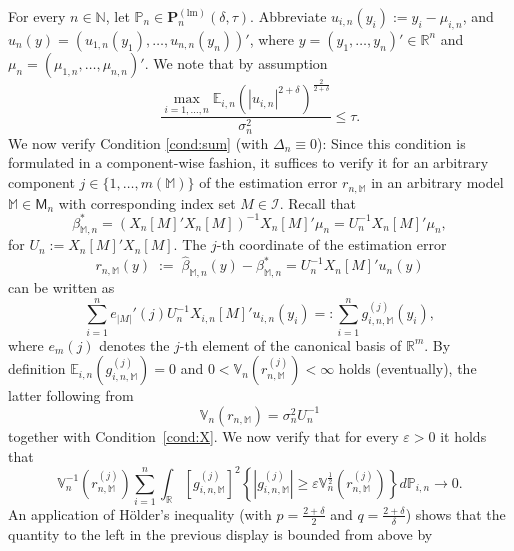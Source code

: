 \documentclass[preprint]{imsart}
\newcommand{\R}{{\mathbb R}}
\newcommand{\N}{{\mathbb N}}
\newcommand{\eps}{\varepsilon}
\newcommand{\M}{\mathbb M}
\numberwithin{equation}{section}
\begin{document}
For every $n \in \N$, let $\mathbb{P}_n \in \mathbf{P}_n^{(\mathrm{lm})}(\delta, \tau)$. Abbreviate $u_{i,n}(y_i) := y_i - \mu_{i,n}$, and $u_n(y) = (u_{1,n}(y_1), \hdots, u_{n,n}(y_n))'$, where $y=(y_1,\dots, y_n)'\in\R^n$ and $\mu_n = (\mu_{1,n},\dots, \mu_{n,n})'$. We note that by assumption
%
\begin{equation}\label{eqn:astau}
\frac{\max_{i = 1, \hdots, n} \mathbb{E}_{i,n} (|u_{i,n}|^{2+\delta})^{\frac{2}{2+\delta}}}{\sigma_n^2} \leq \tau.
\end{equation}
%
We now verify Condition \ref{cond:sum} (with $\Delta_n \equiv  0$): Since this condition is formulated in a component-wise fashion, it suffices to verify it for an arbitrary component $j\in\{1,\dots, m(\M)\}$ of the estimation error $r_{n,\M}$ in an arbitrary model $\M\in\mathsf{M}_n$ with corresponding index set $M\in\mathcal I$. Recall that 
%
\begin{equation}
\beta_{\mathbb{M}, n}^{*} = \left(X_n[M]' X_n[M] \right)^{-1} X_n[M]'\mu_n = U_n^{-1} X_n[M]'\mu_n,
\end{equation}
%
for $U_n := X_n[M]' X_n[M] $. The $j$-th coordinate of the estimation error
%
\begin{equation}
r_{n,\M}(y) \;:=\;  \hat{\beta}_{\M,n}(y) - \beta_{\mathbb{M}, n}^{*}  = U_n^{-1}X_n[M]'u_n(y)
\end{equation}
%
can be written as
%
\begin{equation}
\sum_{i = 1}^n e_{|M|}'(j)U_n^{-1} X_{i,n}[M]' u_{i,n}(y_i) =: \sum_{i=1}^n g^{(j)}_{i,n,\M}(y_i),
\end{equation}
%
where $e_m(j)$ denotes the $j$-th element of the canonical basis of $\R^m$. 
By definition $\mathbb{E}_{i,n} \left( g_{i,n,\M}^{(j)} \right) = 0$  and $0 < \mathbb{V}_{n} \left( r_{n,\M}^{(j)} \right) < \infty$ holds (eventually), the latter following from
%
\begin{equation}\label{eqn:varhomlin}
\mathbb{V}_{n} \left( r_{n,\M} \right) = \sigma_n^2 U_n^{-1}
\end{equation}
%
together with Condition~\ref{cond:X}. We now verify that for every $\eps > 0$ it holds that
%
\begin{equation}\label{eqn:lindehomreg}
\mathbb{V}_n^{-1}\left(r_{n,\M}^{(j)}\right) \sum_{i = 1}^n \int_\R \left[ g_{i,n,\M}^{(j)}\right]^2 \left\{ |g_{i,n,\M}^{(j)}| \geq \eps \mathbb{V}_n^{\frac{1}{2}}\left(r_{n,\M}^{(j)}\right) \right\} d \mathbb{P}_{i,n} \to 0.
\end{equation}
%
An application of H\"older's inequality (with $p = \frac{2+\delta}{2}$ and $q = \frac{2+\delta}{\delta}$) shows that the quantity to the left in the previous display is bounded from above by
\end{document}
